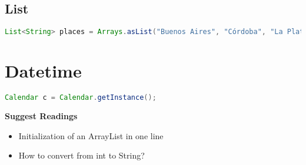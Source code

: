 \subsection{List}

\begin{lstlisting}[language=Java]
List<String> places = Arrays.asList("Buenos Aires", "Córdoba", "La Plata");
\end{lstlisting}

\section{Datetime}

\begin{lstlisting}[language=Java]
Calendar c = Calendar.getInstance();
\end{lstlisting}

\textbf{Suggest Readings}

\begin{itemize}
  \item Initialization of an ArrayList in one line
  \item How to convert from int to String?
\end{itemize}
